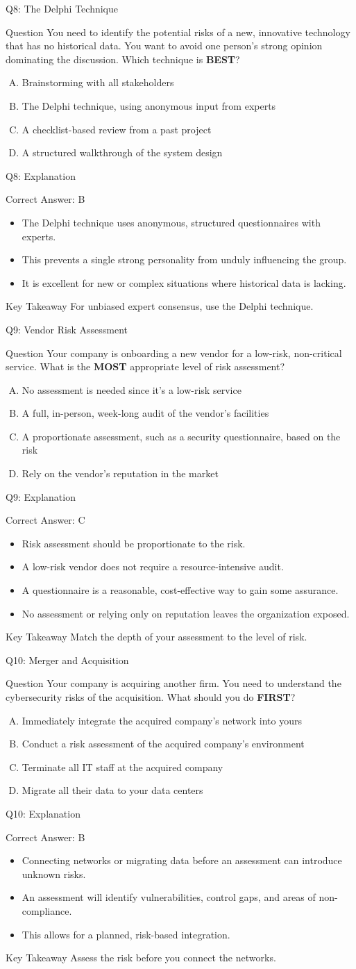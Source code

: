 \documentclass[aspectratio=169]{beamer}
\newcommand{\hq}[7]{%
	\begin{frame}{Q#1: #2}
		\begin{block}{Question}
			#3
		\end{block}
		\begin{enumerate}[(A)]
			#4
		\end{enumerate}
	\end{frame}
	\begin{frame}{Q#1: Explanation}
		\begin{block}{Correct Answer: #5}
			\begin{itemize}
				#6
			\end{itemize}
		\end{block}
		\begin{alertblock}{Key Takeaway}
			#7
		\end{alertblock}
	\end{frame}
}
\begin{document}
	\hq{8}{The Delphi Technique}
	{You need to identify the potential risks of a new, innovative technology that has no historical data. You want to avoid one person's strong opinion dominating the discussion. Which technique is \textbf{BEST}?}
	{\item Brainstorming with all stakeholders
		\item The Delphi technique, using anonymous input from experts
		\item A checklist-based review from a past project
		\item A structured walkthrough of the system design}
	{B}
	{\item The Delphi technique uses anonymous, structured questionnaires with experts.
		\item This prevents a single strong personality from unduly influencing the group.
		\item It is excellent for new or complex situations where historical data is lacking.}
	{For unbiased expert consensus, use the Delphi technique.}
	
	\hq{9}{Vendor Risk Assessment}
	{Your company is onboarding a new vendor for a low-risk, non-critical service. What is the \textbf{MOST} appropriate level of risk assessment?}
	{\item No assessment is needed since it's a low-risk service
		\item A full, in-person, week-long audit of the vendor's facilities
		\item A proportionate assessment, such as a security questionnaire, based on the risk
		\item Rely on the vendor's reputation in the market}
	{C}
	{\item Risk assessment should be proportionate to the risk.
		\item A low-risk vendor does not require a resource-intensive audit.
		\item A questionnaire is a reasonable, cost-effective way to gain some assurance.
		\item No assessment or relying only on reputation leaves the organization exposed.}
	{Match the depth of your assessment to the level of risk.}
	
	\hq{10}{Merger and Acquisition}
	{Your company is acquiring another firm. You need to understand the cybersecurity risks of the acquisition. What should you do \textbf{FIRST}?}
	{\item Immediately integrate the acquired company's network into yours
		\item Conduct a risk assessment of the acquired company's environment
		\item Terminate all IT staff at the acquired company
		\item Migrate all their data to your data centers}
	{B}
	{\item Connecting networks or migrating data before an assessment can introduce unknown risks.
		\item An assessment will identify vulnerabilities, control gaps, and areas of non-compliance.
		\item This allows for a planned, risk-based integration.}
	{Assess the risk before you connect the networks.}
	
\end{document}
